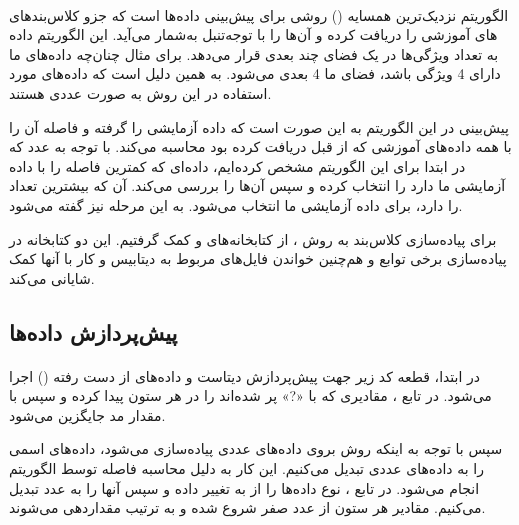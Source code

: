 \documentclass[a4paper,12pt]{article}
\begin{document}
\paragraph{}
الگوریتم  نزدیک‌ترین همسایه () روشی برای پیش‌بینی  داده‌ها است که جزو کلاس‌بندهای تنبل به‌شمار می‌آید. این الگوریتم داده‌‎های آموزشی را دریافت کرده و آن‌ها را با توجه به تعداد ویژگی‌ها در یک فضای چند بعدی قرار می‌دهد. برای مثال چنان‌چه داد‌ه‌های ما دارای 4 ویژگی باشد، فضای ما 4 بعدی می‌شود. به همین دلیل است که داده‌های مورد استفاده در این روش به صورت عددی هستند.

پیش‌بینی در این الگوریتم به این صورت است که داده آزمایشی را گرفته و فاصله آن را با همه داده‌های آموزشی که از قبل دریافت کرده بود محاسبه می‌کند. با توجه به عدد  که در ابتدا برای این الگوریتم مشخص کرده‌ایم،  داده‌ای که کمترین فاصله را با داده آزمایشی ما دارد را انتخاب کرده و سپس  آن‌ها را بررسی می‌کند. آن  که بیشترین تعداد را دارد، برای  داده آزمایشی ما انتخاب می‌شود. به این مرحله  نیز گفته می‌شود.

برای پیاده‌سازی کلاس‌بند به روش ، از کتابخانه‌های  و  کمک گرفتیم. این دو کتابخانه در پیاده‌سازی برخی توابع و هم‌چنین خواندن فایل‌های مربوط به دیتابیس و کار با آنها کمک شایانی می‌کند.

\subsection{پیش‌پردازش داده‌ها}
\paragraph{}
در ابتدا، قطعه کد زیر جهت پیش‌پردازش دیتاست و داده‌های از دست رفته
 () اجرا می‌شود.
  در تابع ، مقادیری که با «?» پر شده‌اند را در هر ستون پیدا کرده و سپس با مقدار مد جایگزین می‌شود.

\begin{flushleft}
\end{flushleft}

سپس با توجه به اینکه روش  بروی داده‌های عددی پیاده‌سازی می‌شود، داده‌های اسمی را به داده‌های عددی تبدیل می‌کنیم. این کار به دلیل محاسبه فاصله توسط الگوریتم  انجام می‌شود.
در تابع ، نوع داده‌ها را از  به  تغییر داده و سپس آنها را به عدد تبدیل می‌کنیم. مقادیر هر ستون از عدد صفر شروع شده و به ترتیب مقداردهی می‌شوند.
\end{document}
